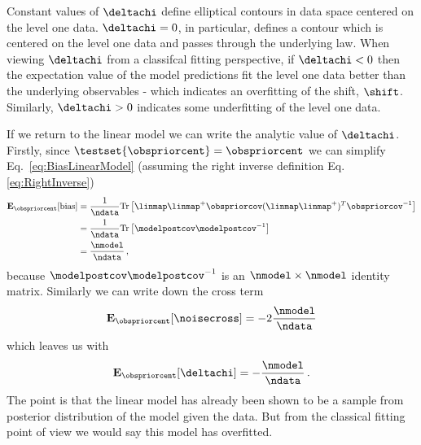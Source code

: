 Constant values of $\deltachi$ define elliptical contours in data space
centered on the level one data. $\deltachi = 0$, in particular, defines a
contour which is centered on the level one data and passes through the
underlying law. When viewing $\deltachi$ from a classifcal fitting perspective,
if $\deltachi < 0$ then the expectation value of the model
predictions fit the level one data better than the underlying observables -
which indicates an overfitting of the shift, $\boldsymbol{\shift}$. Similarly,
$\deltachi > 0$ indicates some underfitting of the level one data.

If we return to the linear model we can write the analytic value of
$\deltachi$. Firstly, since $\testset{\obspriorcent}=\obspriorcent$ we can
simplify Eq.~\ref{eq:BiasLinearModel} (assuming the right
inverse definition Eq.\ref{eq:RightInverse})
\begin{equation}\label{eq:BiasLinearModelSimple}
    \begin{split}
        \mathbf{E}_{\obspriorcent}[{\rm bias}] &= \frac{1}{\ndata}
            {\rm Tr} \left[
                \linmap \linmap^+ \obspriorcov (\linmap \linmap^+)^T \obspriorcov^{-1}
            \right] \\
            &= \frac{1}{\ndata}{\rm Tr} \left[ \modelpostcov \modelpostcov^{-1}\right] \\
            &= \frac{\nmodel}{\ndata} \, ,
    \end{split}
\end{equation}
because $\modelpostcov \modelpostcov^{-1}$ is an $\nmodel \times \nmodel$ identity
matrix. Similarly we can write down the cross term
\begin{equation}
    \begin{split}
        \mathbf{E}_{\obspriorcent}[\noisecross] = -2 \frac{\nmodel}{\ndata}
    \end{split}
\end{equation}
which leaves us with
\begin{equation}
    \mathbf{E}_{\obspriorcent}[\deltachi] = - \frac{\nmodel}{\ndata} \, .
\end{equation}
The point is that the linear model has already been shown to be a sample from
posterior distribution of the model given the data. But from the classical
fitting point of view we would say this model has overfitted.


